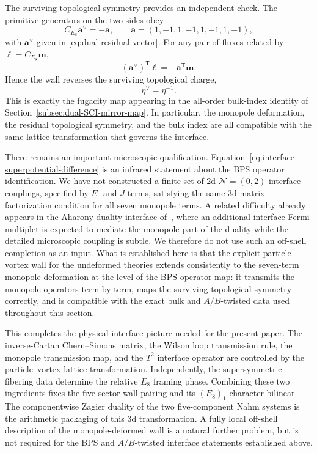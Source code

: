 \documentclass[11pt,a4paper]{article}
\numberwithin{equation}{section}
\begin{document}
The surviving topological symmetry provides an independent check.  The primitive generators on the two sides obey
\begin{equation}
  C_{E_8}\boldsymbol a^\vee=-\boldsymbol a,
  \qquad
  \boldsymbol a=(1,-1,1,-1,1,-1,1,-1),
  \label{eq:interface-residual-symmetry-map}
\end{equation}
with $\boldsymbol a^\vee$ given in \eqref{eq:dual-residual-vector}.  For any pair of fluxes related by $\boldsymbol\ell=C_{E_8}\boldsymbol m$,
\begin{equation}
  (\boldsymbol a^\vee)^{\mathsf T}\boldsymbol\ell
  =-\boldsymbol a^{\mathsf T}\boldsymbol m.
  \label{eq:interface-residual-charge-inversion}
\end{equation}
Hence the wall reverses the surviving topological charge,
\begin{equation}
  \eta^\vee=\eta^{-1}.
  \label{eq:interface-topological-fugacity-inversion}
\end{equation}
This is exactly the fugacity map appearing in the all-order bulk-index identity of Section~\ref{subsec:dual-SCI-mirror-map}.  In particular, the monopole deformation, the residual topological symmetry, and the bulk index are all compatible with the same lattice transformation that governs the interface.

There remains an important microscopic qualification.  Equation~\eqref{eq:interface-superpotential-difference} is an infrared statement about the BPS operator identification.  We have not constructed a finite set of 2d $\mathcal N=(0,2)$ interface couplings, specified by $E$- and $J$-terms, satisfying the same 3d matrix factorization condition for all seven monopole terms.  A related difficulty already appears in the Aharony-duality interface of~\cite{Dimofte:2017tpi}, where an additional interface Fermi multiplet is expected to mediate the monopole part of the duality while the detailed microscopic coupling is subtle.  We therefore do not use such an off-shell completion as an input.  What is established here is that the explicit particle--vortex wall for the undeformed theories extends consistently to the seven-term monopole deformation at the level of the BPS operator map: it transmits the monopole operators term by term, maps the surviving topological symmetry correctly, and is compatible with the exact bulk and $A/B$-twisted data used throughout this section.

This completes the physical interface picture needed for the present paper.  The inverse-Cartan Chern--Simons matrix, the Wilson loop transmission rule, the monopole transmission map, and the $T^2$ interface operator are controlled by the particle--vortex lattice transformation.  Independently, the supersymmetric fibering data determine the relative $E_8$ framing phase.  Combining these two ingredients fixes the five-sector wall pairing and its $(E_8)_1$ character bilinear.  The componentwise Zagier duality of the two five-component Nahm systems is the arithmetic packaging of this 3d transformation.  A fully local off-shell description of the monopole-deformed wall is a natural further problem, but is not required for the BPS and $A/B$-twisted interface statements established above.
\end{document}
